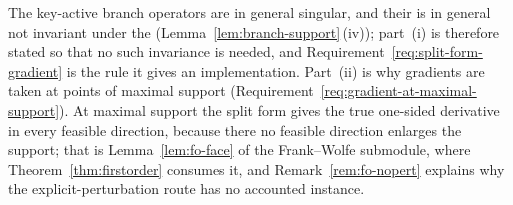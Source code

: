 
The key-active branch operators are in general singular, and their
 is in general not invariant under the
 (Lemma~\ref{lem:branch-support}\,(iv)); part~(i) is therefore
stated so that no such invariance is needed, and
Requirement~\ref{req:split-form-gradient} is the rule it gives an
implementation. Part~(ii) is why gradients are taken at points of maximal
support (Requirement~\ref{req:gradient-at-maximal-support}). At maximal
support the split form gives the true one-sided derivative in every
feasible direction, because there no feasible direction enlarges the
support; that is Lemma~\ref{lem:fo-face} of the Frank--Wolfe submodule,
where Theorem~\ref{thm:firstorder} consumes it, and
Remark~\ref{rem:fo-nopert} explains why the explicit-perturbation route has
no accounted instance.


